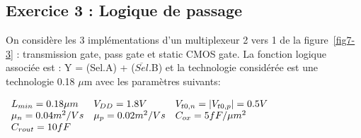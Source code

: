 \subsection*{Exercice 3 : Logique de passage}
On considère les 3 implémentations d'un multiplexeur 2 vers 1 de la figure~\ref{fig7-3} :
transmission gate, pass gate et static CMOS gate. La fonction logique associée est :
Y = (Sel.A) + ($\overline{Sel}$.B) et la technologie considérée est une technologie
0.18 $\mu$m avec les paramètres suivants:

\begin{center}
$
	\begin{array}{l l l}
		L_{min} = 0.18 \mu m 	& V_{DD} = 1.8 V 		& V_{t0,n} = |V_{t0,p} | = 0.5 V \\
		\mu_n = 0.04 m^2/Vs 	& \mu_p = 0.02 m^2/Vs	& C_{ox} = 5 fF/\mu m^2 \\
		C_{rout} = 10fF			&						& \\
	\end{array}
$
\end{center}

